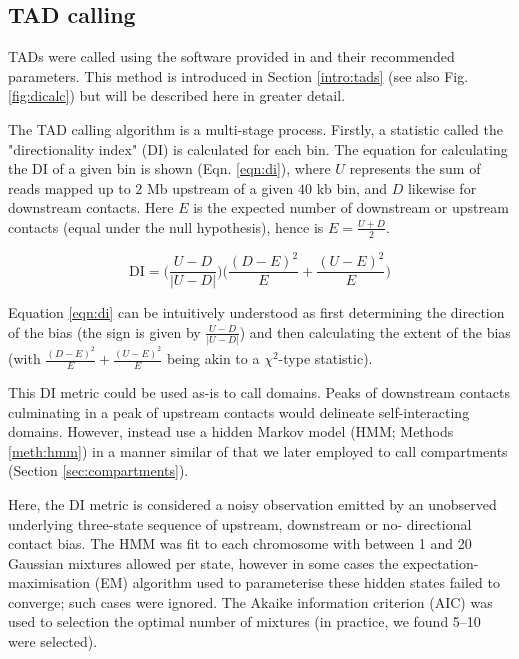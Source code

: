\documentclass[a4paper,11pt,oneside]{book}
\begin{document}
\subsection{TAD calling}\label{meth:tadcalling}

TADs were called using the software provided in
\citet{Dixon2012} and their recommended parameters. This method is introduced in Section \ref{intro:tads} (see also Fig. \ref{fig:dicalc}) but will be described here in greater detail.

The TAD calling algorithm is a multi-stage process. Firstly, a statistic called the "directionality index" (DI) is calculated for each bin.\cite{Dixon2012} The equation for calculating the DI of a given bin is shown (Eqn. \ref{eqn:di}), where $U$ represents the sum of reads mapped up to $2$ Mb upstream of a given $40$ kb bin, and $D$ likewise for downstream contacts. Here $E$ is the expected number of downstream or upstream contacts (equal under the null hypothesis), hence is $E = \frac{U + D}{2}$. 

\begin{equation}\label{eqn:di}
\mathrm{DI} = \bigg(\frac{U - D}{|U - D|}\bigg)\bigg(\frac{(D - E)^2}{E} + \frac{(U - E)^2}{E}\bigg)
\end{equation}\vspace{.2em}

Equation \ref{eqn:di} can be intuitively understood as first determining the direction of the bias (the sign is given by $\frac{U - D}{|U - D|}$) and then calculating the extent of the bias (with $\frac{(D - E)^2}{E} + \frac{(U - E)^2}{E}$ being akin to a $\chi^2$-type statistic).\cite{Dixon2012}

This DI metric could be used as-is to call domains. Peaks of downstream contacts culminating in a peak of upstream contacts would delineate self-interacting domains. However, \citet{Dixon2012} instead use a hidden Markov model (HMM; Methods \ref{meth:hmm}) in a manner similar of that we later employed to call compartments (Section \ref{sec:compartments}). 

Here, the DI metric is considered a noisy observation emitted by an unobserved underlying three-state sequence of upstream, downstream or no- directional contact bias.\cite{Dixon2012} The HMM was fit to each chromosome with between 1 and 20 Gaussian mixtures allowed per state, however in some cases the expectation-maximisation (EM) algorithm used to parameterise these hidden states failed to converge; such cases were ignored. The Akaike information criterion (AIC) was used to selection the optimal number of mixtures (in practice, we found 5--10 were selected). 
\end{document}
